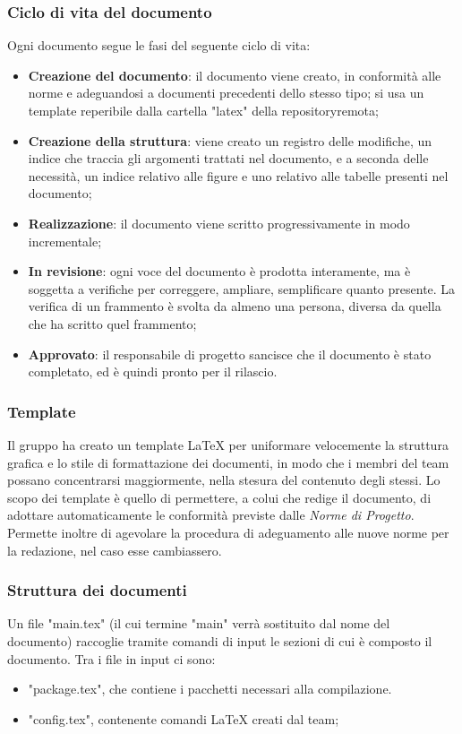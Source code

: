	\subsubsection{Ciclo di vita del documento}
	Ogni documento segue le fasi del seguente ciclo di vita:
	\begin{itemize}
		\item \textbf{Creazione del documento}: il documento viene creato, in conformità alle norme e adeguandosi a documenti precedenti dello stesso tipo; si usa un template reperibile dalla cartella "latex" della repository\glosp remota;
		\item \textbf{Creazione della struttura}: viene creato un registro delle modifiche, un indice che traccia gli argomenti trattati nel documento, e a seconda delle necessità, un indice relativo alle figure e uno relativo alle tabelle presenti nel documento;
		\item \textbf{Realizzazione}: il documento viene scritto progressivamente in modo incrementale;
		\item \textbf{In revisione}: ogni voce del documento è prodotta interamente, ma è soggetta a verifiche per correggere, ampliare, semplificare quanto presente. La verifica di un frammento è svolta da almeno una persona, diversa da quella che ha scritto quel frammento;
		\item \textbf{Approvato}: il responsabile di progetto sancisce che il documento è stato completato, ed è quindi pronto per il rilascio.
	\end{itemize}

	\subsubsection{Template}
	Il gruppo ha creato un template \LaTeX{} per uniformare velocemente la struttura grafica e lo stile di formattazione dei documenti, in modo che i membri del team possano concentrarsi maggiormente, nella stesura del contenuto degli stessi. Lo scopo dei template è quello di permettere, a colui che redige il documento, di adottare automaticamente le conformità previste dalle \textit{Norme di Progetto}. Permette inoltre di agevolare la procedura di adeguamento alle nuove norme per la redazione, nel caso esse cambiassero.
	\subsubsection{Struttura dei documenti}
	Un file "main.tex" (il cui termine "main" verrà sostituito dal nome del documento) raccoglie tramite comandi di input le sezioni di cui è composto il documento. Tra i file in input ci sono:
	\begin{itemize}
		\item "package.tex", che contiene i pacchetti necessari alla compilazione.
		\item "config.tex", contenente comandi \LaTeX{} creati dal team;
	\end{itemize}
